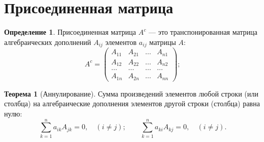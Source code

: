 \documentclass[a5paper, 11pt]{extbook}
\theoremstyle{definition}
\newtheorem{theorem}{Теорема}[section]
\theoremstyle{definition}
\newtheorem{definition}{Определение}[section]
\theoremstyle{definition}
\begin{document}
\section{Присоединенная матрица}
\label{sec:org9f4f382}
\begin{definition}
    Присоединенная матрица \(A^c\) — это транспонированная матрица алгебраических дополнений \(A_{ij}\) элементов \(a_{ij}\) матрицы \(A\):
    \begin{equation*}
        A^c =
        \begin{pmatrix}
            A_{11} & A_{21} & \ldots & A_{n1} \\
            A_{12} & A_{22} & \ldots & A_{n2} \\
            \ldots & \ldots & \ldots & \ldots \\
            A_{1n} & A_{2n} & \ldots & A_{nn}
        \end{pmatrix};
    \end{equation*}
\end{definition}

\begin{theorem}[Аннулирование]
    Сумма произведений  элементов любой строки (или столбца) на алгебраические дополнения элементов другой строки (столбца) равна нулю:
    \begin{equation*}
        \sum_{k = 1}^n a_{ik} A_{jk} = 0, \quad (i \neq j);
        \qquad
        \sum_{k = 1}^n a_{ki} A_{kj} = 0, \quad (i \neq j).
    \end{equation*}
    \label{det-cancellation}
\end{theorem}
\end{document}
